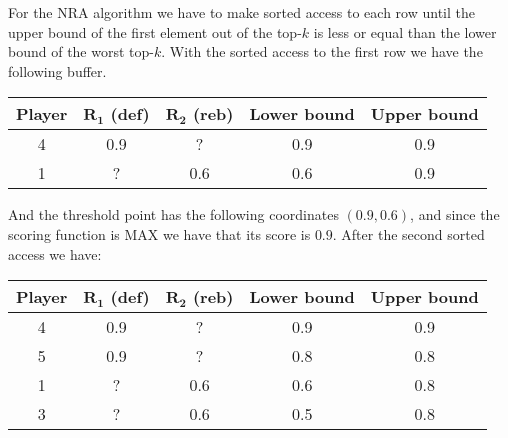 \begin{enumerate}
        For the NRA algorithm we have to make sorted access to each row until the upper bound of the first element out of the top-$k$ is less
        or equal than the lower bound of the worst top-$k$. With the sorted access to the first row we have the following buffer. 
        \begin{table}[H]
            \centering
            \begin{tabular}{c|cc|cc}
            \hline
            \textbf{Player} & \textbf{$\boldsymbol{R_1}$ (def)} & \textbf{$\boldsymbol{R_2}$ (reb)} & \textbf{Lower bound} & \textbf{Upper bound} \\ \hline
            4               & 0.9                               & ?                                 & 0.9                  & 0.9                  \\
            1               & ?                                 & 0.6                               & 0.6                  & 0.9                  \\ \hline
            \end{tabular}
        \end{table}
        And the threshold point has the following coordinates $(0.9,0.6)$, and since the scoring function is MAX we have that its score is $0.9$.
        After the second sorted access we have: 
        \begin{table}[H]
            \centering
            \begin{tabular}{c|cc|cc}
            \hline
            \textbf{Player} & \textbf{$\boldsymbol{R_1}$ (def)} & \textbf{$\boldsymbol{R_2}$ (reb)} & \textbf{Lower bound} & \textbf{Upper bound} \\ \hline
            4               & 0.9                               & ?                                 & 0.9                  & 0.9                  \\
            5               & 0.9                               & ?                                 & 0.8                  & 0.8                  \\
            1               & ?                                 & 0.6                               & 0.6                  & 0.8                  \\
            3               & ?                                 & 0.6                               & 0.5                  & 0.8                  \\ \hline
            \end{tabular}
        \end{table}

\end{enumerate}
